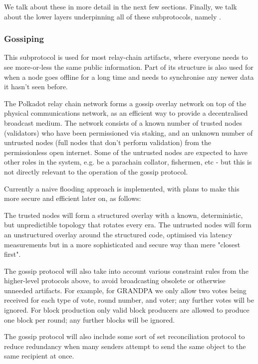 We talk about these in more detail in the next few sections. Finally, we talk about the lower layers underpinning all of these subprotocols, namely .

\subsubsection{Gossiping} \label{sec:gossiping}

This subprotocol is used for most relay-chain artifacts, where everyone needs to see more-or-less the same public information. Part of its structure is also used for when a node goes offline for a long time and needs to synchronise any newer data it hasn't seen before.

The Polkadot relay chain network forms a gossip overlay network on top of the physical communications network, as an efficient way to provide a decentralised broadcast medium. The network consists of a known number of trusted nodes (validators) who have been permissioned via staking, and an unknown number of untrusted nodes (full nodes that don't perform validation) from the permissionless open internet. Some of the untrusted nodes are expected to have other roles in the system, e.g. be a parachain collator, fishermen, etc - but this is not directly relevant to the operation of the gossip protocol.

Currently a naive flooding approach is implemented, with plans to make this more secure and efficient later on, as follows:

The trusted nodes will form a structured overlay with a known, deterministic, but unpredictible topology that rotates every era. The untrusted nodes will form an unstructured overlay around the structured code, optimised via latency measurements but in a more sophisticated and secure way than mere "closest first".

The gossip protocol will also take into account various constraint rules from the higher-level protocols above, to avoid broadcasting obsolete or otherwise unneeded artifacts. For example, for GRANDPA we only allow two votes being received for each type of vote, round number, and voter; any further votes will be ignored. For block production only valid block producers are allowed to produce one block per round; any further blocks will be ignored.

The gossip protocol will also include some sort of set reconciliation protocol to reduce redundancy when many senders attempt to send the same object to the same recipient at once.

